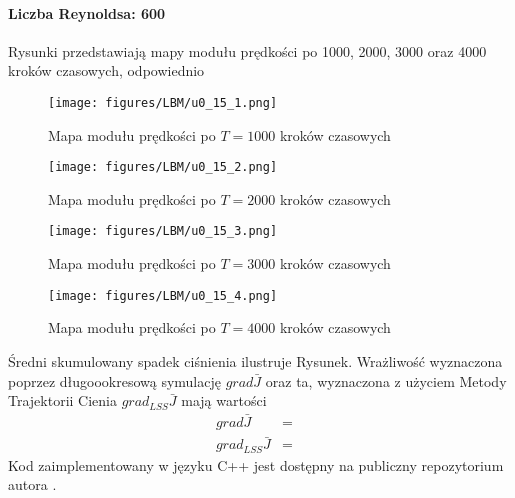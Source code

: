\documentclass[12pt]{article}
\begin{document}
\paragraph{Liczba Reynoldsa: 600}
Rysunki przedstawiają mapy modułu prędkości po 1000, 2000, 3000 oraz 4000 kroków czasowych, odpowiednio 
\begin{figure}[H]
	\texttt{[image: figures/LBM/u0\_15\_1.png]} 
	\caption{Mapa modułu prędkości po $ T=1000 $ kroków czasowych}
\end{figure}
\begin{figure}[H]
	\texttt{[image: figures/LBM/u0\_15\_2.png]} 
	\caption{Mapa modułu prędkości po $ T=2000 $ kroków czasowych}
\end{figure}
\begin{figure}[H]
	\texttt{[image: figures/LBM/u0\_15\_3.png]} 
	\caption{Mapa modułu prędkości po $ T=3000 $ kroków czasowych}
\end{figure}
\begin{figure}[H]
	\texttt{[image: figures/LBM/u0\_15\_4.png]} 
	\caption{Mapa modułu prędkości po $ T=4000 $ kroków czasowych}
\end{figure}
Średni skumulowany spadek ciśnienia ilustruje Rysunek.
Wrażliwość wyznaczona poprzez długoookresową symulację $ grad\bar{J} $ oraz ta, wyznaczona z użyciem Metody Trajektorii Cienia $ grad_{LSS}\bar{J} $ mają wartości
\begin{equation}
\begin{array}{rcl}
grad\bar{J} &=& \\
grad_{LSS}\bar{J} &=& 
\end{array} 
\label{result600}
\end{equation}
Kod zaimplementowany w języku C++ jest dostępny na publiczny repozytorium autora \cite{Marek2}.
\newpage
\end{document}
